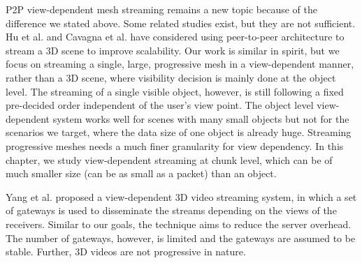    P2P view-dependent mesh streaming remains a new topic because
    of the difference we stated above. 
    Some related studies exist, but they are not sufficient.
    Hu et al. \cite{Hu2008} and Cavagna et al. \cite{Cavagna2006} have considered using peer-to-peer architecture to stream a 3D scene
    to improve scalability.  Our work is similar in
    spirit, but we focus on streaming a single, large,
    progressive mesh in a view-dependent manner, rather than a 3D scene,
    where visibility decision is mainly done at the object level.
    The streaming
    of a single visible object, however, is still following a fixed
    pre-decided order independent of the user's view point. 
    The object level view-dependent system works well
    for scenes with many small objects but not for the
    scenarios we target,
    where %
    the data size of one object is already huge.  
    Streaming %
    progressive meshes needs 
    a much finer granularity for view dependency. 
    In this chapter, we study view-dependent streaming at 
    chunk level, which can be of much smaller size (can be as small as a packet) than an object.

Yang et al. \cite{viewcast:yang} proposed a view-dependent 
3D video streaming system, in which a set of gateways is used 
to disseminate the streams depending on the views of the receivers.
Similar to our goals, the technique aims to reduce the server 
overhead.  The number of gateways, however, is limited and the
gateways are assumed to be stable.  Further, 3D videos are not
progressive in nature. 


